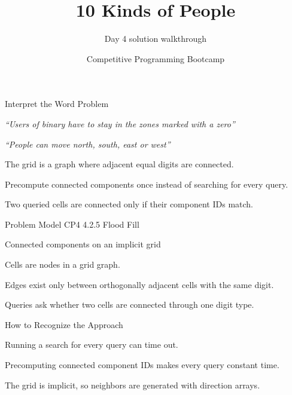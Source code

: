 \documentclass[aspectratio=169,11pt]{beamer}
\title[10kindsofpeople]{10 Kinds of People}
\subtitle{Day 4 solution walkthrough}
\author[Solution Deck]{Competitive Programming Bootcamp}
\date{}
\begin{document}
\begin{frame}[plain]
  \titlepage
\end{frame}

\begin{frame}{Interpret the Word Problem}
\small
{}
\begin{tightitemize}
  \item \textit{``Users of binary have to stay in the zones marked with a zero''}
  \item \textit{``People can move north, south, east or west''}
\end{tightitemize}

\vspace{0.18cm}
\begin{tightitemize}
  \item The grid is a graph where adjacent equal digits are connected.
  \item Precompute connected components once instead of searching for every query.
  \item Two queried cells are connected only if their component IDs match.
\end{tightitemize}
\end{frame}







\begin{frame}{Problem Model}
\small
{} CP4 4.2.5 Flood Fill

\vspace{0.25cm}
 Connected components on an implicit grid

\vspace{0.25cm}
\begin{tightitemize}
  \item Cells are nodes in a grid graph.
  \item Edges exist only between orthogonally adjacent cells with the same digit.
  \item Queries ask whether two cells are connected through one digit type.
\end{tightitemize}
\end{frame}

\begin{frame}{How to Recognize the Approach}
\begin{tightitemize}
  \item Running a search for every query can time out.
  \item Precomputing connected component IDs makes every query constant time.
  \item The grid is implicit, so neighbors are generated with direction arrays.
\end{tightitemize}
\end{frame}
\end{document}
